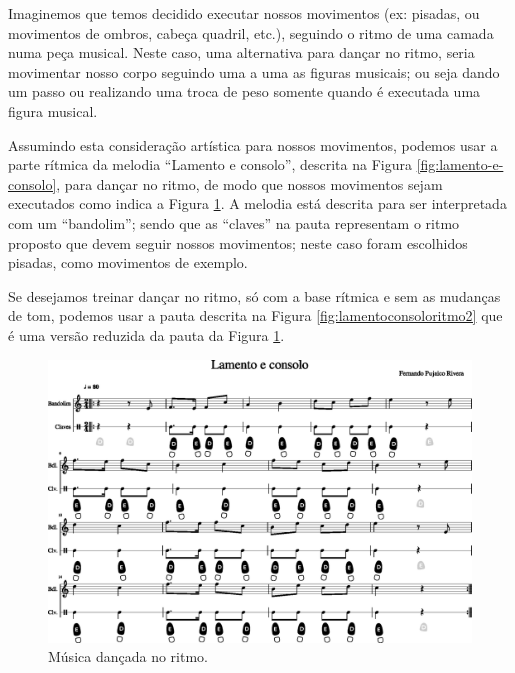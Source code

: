 \begin{example}
\label{ex:dancaritmo1}
Imaginemos que temos decidido executar nossos movimentos (ex: pisadas, ou movimentos de ombros, cabeça quadril, etc.),
seguindo o ritmo de uma camada numa peça musical.
Neste caso, uma alternativa para dançar no ritmo, 
seria movimentar nosso corpo seguindo uma a uma as figuras musicais;
ou seja dando um passo ou realizando uma troca de peso somente quando é executada uma figura musical.

Assumindo esta  consideração artística para nossos movimentos, 
podemos usar a parte rítmica da melodia ``Lamento e consolo'', descrita na Figura \ref{fig:lamento-e-consolo},
para dançar no ritmo, 
de modo que nossos movimentos sejam executados como indica a Figura \ref{fig:lamentoconsoloritmo1}.
A melodia está descrita para ser interpretada com um ``bandolim'';
sendo que as ``claves'' na pauta representam o ritmo proposto que devem seguir nossos movimentos;
neste caso foram escolhidos pisadas, como movimentos de exemplo.

Se desejamos treinar dançar no ritmo, só com a base rítmica e sem as mudanças de tom,  
podemos usar a pauta descrita na Figura \ref{fig:lamentoconsoloritmo2} que é uma versão 
reduzida da pauta da Figura \ref{fig:lamentoconsoloritmo1}.

\end{example}
\begin{figure}
    \centering
    \includegraphics[width=\textwidth]{chapters/cap-musicalidade-tecnica/lamento-e-consolo-clave-ritmo-1.eps}
    \caption{Música dançada no ritmo.}
    \label{fig:lamentoconsoloritmo1}
\end{figure}


